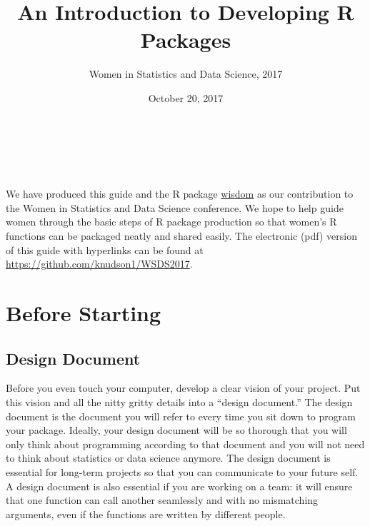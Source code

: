 \documentclass{article}
\title{An Introduction to Developing R Packages}
\author{Women in Statistics and Data Science, 2017}
\date{October 20, 2017}
\begin{document}
\maketitle{}

\\
 \\ \\ 



We have  produced this guide and the R package \href{https://github.com/knudson1/WSDS2017}{wisdom} as our contribution to the Women in Statistics and Data Science conference. We hope to help guide women through the basic steps of R package production so that  women's R functions can be packaged neatly and shared easily. The electronic (pdf) version of this guide with  hyperlinks can be found at \href{https://github.com/knudson1/WSDS2017/blob/master/guide/Rpackages.pdf}{\url{https://github.com/knudson1/WSDS2017}}.


\section{Before Starting}




\subsection{Design Document}
Before you even touch your computer, develop a clear vision of your project. Put this vision and all the nitty gritty details  into a ``design document.'' The design document is the document you will refer to every time you sit down to program your package. Ideally,  your design document  will be so thorough that you will only think about programming according to that document and you will not need to think about statistics or data science anymore. The design document is essential for long-term projects so that you can communicate to your future self. A design document is also essential if you are working on a team: it will ensure that one function can call another seamlessly and with no mismatching arguments, even if the functions are written by different people.
\end{document}
